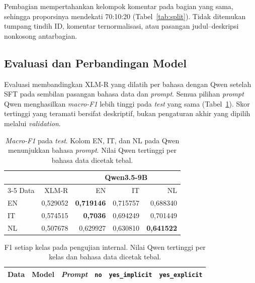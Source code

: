 \documentclass[11pt]{article}
\begin{document}
Pembagian mempertahankan kelompok komentar pada bagian yang sama, sehingga proporsinya mendekati 70:10:20 (Tabel~\ref{tab:split}). Tidak ditemukan tumpang tindih ID, komentar ternormalisasi, atau pasangan judul--deskripsi nonkosong antarbagian.



\subsection{Evaluasi dan Perbandingan Model}

Evaluasi membandingkan XLM-R yang dilatih per bahasa dengan Qwen setelah SFT pada sembilan pasangan bahasa data dan \textit{prompt}. Semua pilihan \textit{prompt} Qwen menghasilkan \textit{macro-F1} lebih tinggi pada \textit{test} yang sama (Tabel~\ref{tab:main}). Skor tertinggi yang teramati bersifat deskriptif, bukan pengaturan akhir yang dipilih melalui \textit{validation}.

\begin{table}[t]
\centering\small
\setlength{\tabcolsep}{3pt}
\begin{tabular}{lrrrr}
\toprule
 & & \multicolumn{3}{c}{Qwen3.5-9B} \\
\cmidrule(lr){3-5}
Data & XLM-R & EN & IT & NL \\
\midrule
EN & 0,529052 & \textbf{0,719146} & 0,715757 & 0,688340 \\
IT & 0,574515 & \textbf{0,7036}   & 0,694249 & 0,701449 \\
NL & 0,507678 & 0,629927          & 0,630810 & \textbf{0,641522} \\
\bottomrule
\end{tabular}
\caption{\textit{Macro-F1} pada \textit{test}. Kolom EN, IT, dan NL pada Qwen menunjukkan bahasa \textit{prompt}. Nilai Qwen tertinggi per bahasa data dicetak tebal.}
\label{tab:main}
\end{table}

\begin{table}[t]
\centering\small
\begin{tabular}{lllrrr}
\toprule
Data & Model & \textit{Prompt} & \texttt{no} & \texttt{yes\_implicit} & \texttt{yes\_explicit} \\
\midrule

\end{tabular}
\caption{F1 setiap kelas pada pengujian internal. Nilai Qwen tertinggi per kelas dan bahasa data dicetak tebal.}\label{tab:classes}
\end{table}
\end{document}
